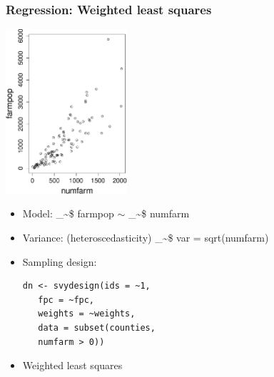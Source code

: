 \documentclass[framenumber,t]{beamer}
\makeatletter
\newcommand\code{\bgroup\@makeother\_\@makeother\~\@makeother\$\@makeother\^\@codex}
\def\@codex#1{{\normalfont\ttfamily\hyphenchar\font=-1 #1}\egroup}
\makeatother
\begin{document}
\begin{frame}[fragile]
\frametitle{Regression: Weighted least squares}
    \begin{multicols}{2}
        \includegraphics[width=4.5cm]{figure/scatter_counties}
        \columnbreak
        \begin{itemize}
            \setlength\itemsep{1em}
            \item \alert{Model:} \code{farmpop} $\sim$ \code{numfarm}
            \item \alert{Variance:} (heteroscedasticity)
                \code{var = sqrt(numfarm)}
            \item \alert{Sampling design:} %
\begin{verbatim}
dn <- svydesign(ids = ~1,
   fpc = ~fpc,
   weights = ~weights,
   data = subset(counties,
   numfarm > 0))
\end{verbatim}
            \item \alert{Weighted least squares}
        \end{itemize}
    \end{multicols}
\end{frame}
\end{document}
